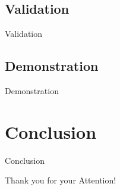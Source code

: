 \documentclass[16pt]{beamer}
\begin{document}
\subsection{Validation}
\begin{frame}[t]{Validation}
\end{frame}

\subsection{Demonstration}
\begin{frame}[t]{Demonstration}
\end{frame}

\section{Conclusion}
\begin{frame}[t]{Conclusion}
\end{frame}

\begin{frame}[c]{}
\begin{center}
Thank you for your Attention!
\end{center}
\end{frame}
\end{document}

